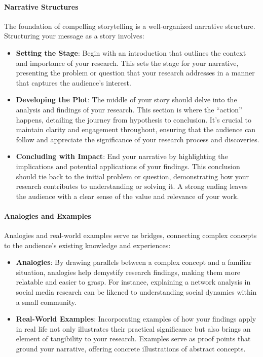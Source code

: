 \documentclass[
]{book}
\begin{document}
\hypertarget{narrative-structures}{%
\paragraph{Narrative Structures}\label{narrative-structures}}

The foundation of compelling storytelling is a well-organized narrative structure. Structuring your message as a story involves:

\begin{itemize}
\item
  \textbf{Setting the Stage}: Begin with an introduction that outlines the context and importance of your research. This sets the stage for your narrative, presenting the problem or question that your research addresses in a manner that captures the audience's interest.
\item
  \textbf{Developing the Plot}: The middle of your story should delve into the analysis and findings of your research. This section is where the ``action'' happens, detailing the journey from hypothesis to conclusion. It's crucial to maintain clarity and engagement throughout, ensuring that the audience can follow and appreciate the significance of your research process and discoveries.
\item
  \textbf{Concluding with Impact}: End your narrative by highlighting the implications and potential applications of your findings. This conclusion should tie back to the initial problem or question, demonstrating how your research contributes to understanding or solving it. A strong ending leaves the audience with a clear sense of the value and relevance of your work.
\end{itemize}

\hypertarget{analogies-and-examples}{%
\paragraph{Analogies and Examples}\label{analogies-and-examples}}

Analogies and real-world examples serve as bridges, connecting complex concepts to the audience's existing knowledge and experiences:

\begin{itemize}
\item
  \textbf{Analogies}: By drawing parallels between a complex concept and a familiar situation, analogies help demystify research findings, making them more relatable and easier to grasp. For instance, explaining a network analysis in social media research can be likened to understanding social dynamics within a small community.
\item
  \textbf{Real-World Examples}: Incorporating examples of how your findings apply in real life not only illustrates their practical significance but also brings an element of tangibility to your research. Examples serve as proof points that ground your narrative, offering concrete illustrations of abstract concepts.
\end{itemize}
\end{document}

